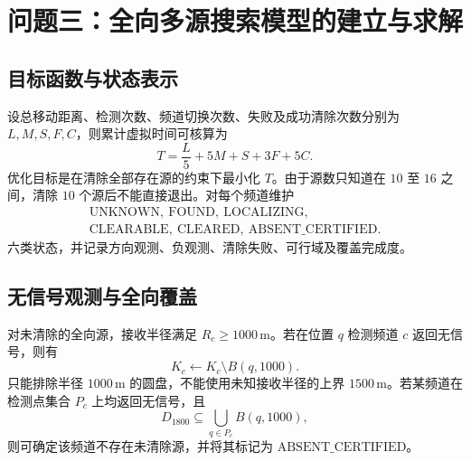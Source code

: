 \section{问题三：全向多源搜索模型的建立与求解}

\subsection{目标函数与状态表示}
设总移动距离、检测次数、频道切换次数、失败及成功清除次数分别为 $L,M,S,F,C$，则累计虚拟时间可核算为
\begin{equation}
  T=\frac{L}{5}+5M+S+3F+5C.
  \label{eq:virtual-time}
\end{equation}
优化目标是在清除全部存在源的约束下最小化 $T$。由于源数只知道在 $10$ 至 $16$ 之间，清除 $10$ 个源后不能直接退出。对每个频道维护
\begin{equation}
  \begin{gathered}
  \mathrm{UNKNOWN},\ \mathrm{FOUND},\ \mathrm{LOCALIZING},\\
  \mathrm{CLEARABLE},\ \mathrm{CLEARED},\ \mathrm{ABSENT\_CERTIFIED}.
  \end{gathered}
\end{equation}
六类状态，并记录方向观测、负观测、清除失败、可行域及覆盖完成度。

\subsection{无信号观测与全向覆盖}
对未清除的全向源，接收半径满足 $R_c\geq1000\,\mathrm{m}$。若在位置 $q$ 检测频道 $c$ 返回无信号，则有
\begin{equation}
  K_c\leftarrow K_c\setminus B(q,1000).
  \label{eq:omni-negative-update}
\end{equation}
只能排除半径 $1000\,\mathrm{m}$ 的圆盘，不能使用未知接收半径的上界 $1500\,\mathrm{m}$。若某频道在检测点集合 $P_c$ 上均返回无信号，且
\begin{equation}
  D_{1800}\subseteq\bigcup_{q\in P_c}B(q,1000),
  \label{eq:absence-certificate}
\end{equation}
则可确定该频道不存在未清除源，并将其标记为 $\mathrm{ABSENT\_CERTIFIED}$。


